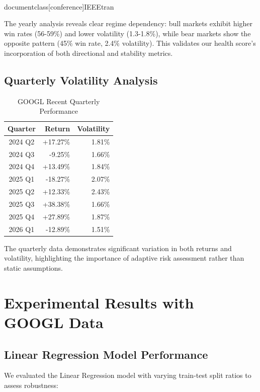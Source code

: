 \\documentclass[conference]{IEEEtran}
\begin{document}
The yearly analysis reveals clear regime dependency: bull markets exhibit higher win rates (56-59\%) and lower volatility (1.3-1.8\%), while bear markets show the opposite pattern (45\% win rate, 2.4\% volatility). This validates our health score's incorporation of both directional and stability metrics.

\subsection{Quarterly Volatility Analysis}

\begin{table}[H]
\caption{GOOGL Recent Quarterly Performance}
\begin{center}
\begin{tabular}{|c|r|r|}
\hline
\textbf{Quarter} & \textbf{Return} & \textbf{Volatility} \\
\hline
2024 Q2 & +17.27\% & 1.81\% \\
\hline
2024 Q3 & -9.25\% & 1.66\% \\
\hline
2024 Q4 & +13.49\% & 1.84\% \\
\hline
2025 Q1 & -18.27\% & 2.07\% \\
\hline
2025 Q2 & +12.33\% & 2.43\% \\
\hline
2025 Q3 & +38.38\% & 1.66\% \\
\hline
2025 Q4 & +27.89\% & 1.87\% \\
\hline
2026 Q1 & -12.89\% & 1.51\% \\
\hline
\end{tabular}
\label{tab:googl_quarterly}
\end{center}
\end{table}

The quarterly data demonstrates significant variation in both returns and volatility, highlighting the importance of adaptive risk assessment rather than static assumptions.

\section{Experimental Results with GOOGL Data}

\subsection{Linear Regression Model Performance}

We evaluated the Linear Regression model with varying train-test split ratios to assess robustness:
\end{document}
